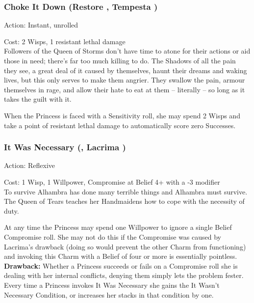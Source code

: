 \subsubsection*{Choke It Down (Restore \textbullet\textbullet\textbullet, Tempesta \textbullet\textbullet)}

\noindent Action: Instant, unrolled

\noindent Cost: 2 Wisps, 1 resistant lethal damage \\

\noindent Followers of the Queen of Storms don't have time to atone for their actions or aid those in need; there's far too much killing to do. The Shadows of all the pain they see, a great deal of it caused by themselves, haunt their dreams and waking lives, but this only serves to make them angrier. They swallow the pain, armour themselves in rage, and allow their hate to eat at them -- literally -- so long as it takes the guilt with it.

When the Princess is faced with a Sensitivity roll, she may spend 2 Wisps and take a point of resistant lethal damage to automatically score zero Successes. 

\subsubsection*{It Was Necessary (\textbullet\textbullet\textbullet, Lacrima \textbullet\textbullet\textbullet\textbullet)}

\noindent Action: Reflexive

\noindent Cost: 1 Wisp, 1 Willpower, Compromise at Belief 4+ with a -3 modifier\\

\noindent To survive Alhambra has done many terrible things and Alhambra must survive. The Queen of Tears teaches her Handmaidens how to cope with the necessity of duty. 

At any time the Princess may spend one Willpower to ignore a single Belief Compromise roll. She may not do this if the Compromise was caused by Lacrima's drawback (doing so would prevent the other Charm from functioning) and invoking this Charm with a Belief of four or more is essentially pointless.\\

\noindent \textbf{Drawback:} Whether a Princess succeeds or fails on a Compromise roll she is dealing with her internal conflicts, denying them simply lets the problem fester. Every time a Princess invokes It Was Necessary she gains the It Wasn't Necessary Condition, or increases her stacks in that condition by one. 

